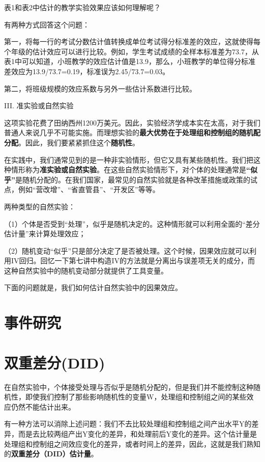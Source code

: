 \documentclass[cn,10pt,math=newtx,citestyle=gb7714-2015,bibstyle=gb7714-2015]{elegantbook}
\begin{document}
	表1和表2中估计的教学实验效果应该如何理解呢？
	
	有两种方式回答这个问题：
	
	第一，将每一行的考试分数估计值转换成单位考试得分标准差的效应，这就使得每个年级的估计效应可以进行比较。例如，学生考试成绩的全样本标准差为73.7，从表1中可以知道，小班教学的效应估计值是13.9，那么，小班教学的单位得分标准差效应为13.9/73.7=0.19，标准误为2.45/73.7=0.03。
	
	第二，将班级规模的效应系数与另外一些估计系数进行比较。
	
	III. 准实验或自然实验
	
	这项实验花费了田纳西州1200万美元。因此，实验经济学成本实在太高，对于我们普通人来说几乎不可能实施。而理想实验的\textbf{最大优势在于处理组和控制组的随机配分配}。因此，我们要紧紧抓住这个\textbf{随机性}。
	
	在实践中，我们通常见到的是一种非实验情形，但它又具有某些随机性。我们把这种情形称为\textbf{准实验或自然实验}。在这些自然实验情形下，对个体的处理通常是\textbf{“似乎”}是随机分配的。在我们国家，最常见的自然实验就是各种改革措施或政策的试点，例如“营改增”、“省直管县”、“开发区”等等。
	
	两种类型的自然实验：
	
	（1）个体是否受到“处理”，似乎是随机决定的。这种情形就可以利用全面的“差分估计量”来计算处理效应；
	
	（2）随机变动“似乎”只是部分决定了是否被处理。这个时候，因果效应就可以利用IV回归。回忆一下第七讲中构造IV的方法就是分离出与误差项无关的成分，而这种自然实验中的随机变动部分就提供了工具变量。
	
	下面的问题就是，我们如何估计自然实验中的因果效应。
	
	\section{事件研究}
	
	
	
	
	\section{双重差分(DID)}
	
	在自然实验中，个体接受处理与否似乎是随机分配的，但是我们并不能控制这种随机性，即使我们控制了那些影响随机性的变量W，处理组和控制组之间的某些效应仍然不能估计出来。
	
	有一种方法可以消除上述问题：我们不去比较处理组和控制组之间产出水平Y的差异，而是去比较两组产出Y变化的差异，和处理前后Y变化的差异。这个估计量是处理组和控制组之间效应变化的差异，或者时间上的差异，因此，这就是我们熟知的\textbf{双重差分（DID）估计量}。
	
\end{document}
